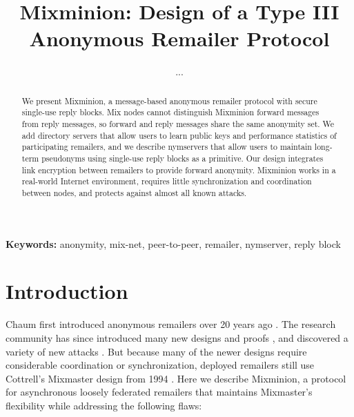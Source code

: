 \documentclass[11pt]{IEEEtran}
\newcommand\emailaddr{\begingroup \def\UrlLeft{<}\def\UrlRight{>}\urlstyle{tt}\Url}
\begin{document}

\title{Mixminion: Design of a Type III Anonymous Remailer Protocol}

% 
\author{...}

\maketitle
\pagestyle{plain} 
 
\begin{abstract}

We present Mixminion, a message-based anonymous remailer protocol with
secure single-use reply blocks. Mix nodes cannot distinguish
Mixminion forward messages from reply messages, so forward and reply
messages share
the same anonymity set. We add directory servers that allow users to
learn public keys and performance statistics of participating remailers,
and we describe nymservers that allow users to maintain long-term
pseudonyms using single-use reply blocks as a primitive. Our design
integrates link encryption between remailers to provide
forward anonymity. Mixminion works in a real-world Internet environment,
requires little synchronization and coordination between nodes, and
protects against almost all known attacks.

\end{abstract}

\noindent \textbf{Keywords:} anonymity, mix-net, peer-to-peer, remailer, nymserver, reply block


\section{Introduction}
\label{sec:intro}

Chaum first introduced anonymous remailers over 20 years ago
\cite{chaum-mix}. The research community has since introduced many new
designs and proofs \cite{abe}\cite{babel}\cite{flash-mix}\cite{kesdogan}\cite{shuffle}\cite{hybrid-mix},
and discovered a variety of new attacks
\cite{back-traffic-analysis}\cite{langos02}\cite{disad-free-routes}\cite{desmedt}\cite{mitkuro}\cite{raymond00}.
But because many of the newer designs require considerable coordination or
synchronization, deployed remailers still use Cottrell's Mixmaster
design from 1994 \cite{mixmaster-attacks}\cite{mixmaster-spec}. Here we describe
Mixminion, a protocol for asynchronous loosely federated remailers that
maintains Mixmaster's flexibility while addressing the following flaws:
\end{document}
